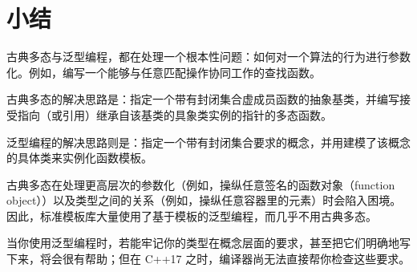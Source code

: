 \section{小结}

古典多态与泛型编程，都在处理一个根本性问题：如何对一个算法的行为进行参数化。例如，编写一个能够与任意匹配操作协同工作的查找函数。

古典多态的解决思路是：指定一个带有封闭集合虚成员函数的抽象基类，并编写接受指向（或引用）继承自该基类的具象类实例的指针的多态函数。

泛型编程的解决思路则是：指定一个带有封闭集合要求的概念，并用建模了该概念的具体类来实例化函数模板。

古典多态在处理更高层次的参数化（例如，操纵任意签名的函数对象（function object））以及类型之间的关系（例如，操纵任意容器里的元素）时会陷入困境。因此，标准模板库大量使用了基于模板的泛型编程，而几乎不用古典多态。

当你使用泛型编程时，若能牢记你的类型在概念层面的要求，甚至把它们明确地写下来，将会很有帮助；但在 C++17 之时，编译器尚无法直接帮你检查这些要求。
